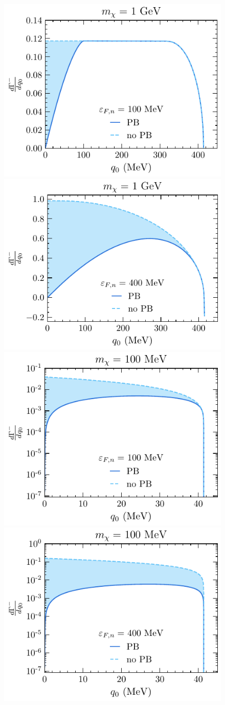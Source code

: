 \begin{figure}[t!bp]
    \centering
    \includegraphics[width=.48\textwidth]{capture_1/diff_intrate_n0_mu_100MeV_mdm1GeV.pdf}
    \includegraphics[width=.48\textwidth]{capture_1/diff_intrate_n0_mu_400MeV_mdm1GeV.pdf}\\
    \includegraphics[width=.48\textwidth]{capture_1/diff_intrate_n0_mu_100MeV_mdm100MeV.pdf}
    \includegraphics[width=.48\textwidth]{capture_1/diff_intrate_n0_mu_400MeV_mdm100MeV.pdf}\\

\end{figure}
